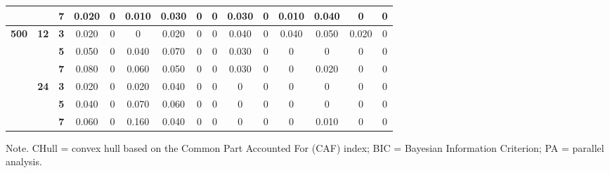 \documentclass[a4paper,man,natbib]{apa6}
\begin{document}
\begin{table}[]
\begin{center}
{\begin{tabular}{ccccccccccccccc}
				&
				&
				\textbf{7} &
				0.020 &
				0 &
				0.010 &
				0.030 &
				0 &
				0 &
				0.030 &
				0 &
				0.010 &
				0.040 &
				0 &
				0 \\ \hline
				\multirow{6}{*}{\textbf{500}} &
				\multirow{3}{*}{\textbf{12}} &
				\textbf{3} &
				0.020 &
				0 &
				0 &
				0.020 &
				0 &
				0 &
				0.040 &
				0 &
				0.040 &
				0.050 &
				0.020 &
				0 \\ \cline{3-15} 
				&
				&
				\textbf{5} &
				0.050 &
				0 &
				0.040 &
				0.070 &
				0 &
				0 &
				0.030 &
				0 &
				0 &
				0 &
				0 &
				0 \\ \cline{3-15} 
				&
				&
				\textbf{7} &
				0.080 &
				0 &
				0.060 &
				0.050 &
				0 &
				0 &
				0.030 &
				0 &
				0 &
				0.020 &
				0 &
				0 \\ \cline{2-15} 
				&
				\multirow{3}{*}{\textbf{24}} &
				\textbf{3} &
				0.020 &
				0 &
				0.020 &
				0.040 &
				0 &
				0 &
				0 &
				0 &
				0 &
				0 &
				0 &
				0 \\ \cline{3-15} 
				&
				&
				\textbf{5} &
				0.040 &
				0 &
				0.070 &
				0.060 &
				0 &
				0 &
				0 &
				0 &
				0 &
				0 &
				0 &
				0 \\ \cline{3-15} 
				&
				&
				\textbf{7} &
				0.060 &
				0 &
				0.160 &
				0.040 &
				0 &
				0 &
				0 &
				0 &
				0 &
				0.010 &
				0 &
				0 \\ \hline
			\end{tabular}%
		}
	\end{center}
	\begin{tablenotes}[flushleft]
		\small
		\item 	Note. CHull = convex hull based on the Common Part Accounted For (CAF) index; BIC = Bayesian Information Criterion; PA = parallel analysis.
	\end{tablenotes}
\end{table}
\end{document}

